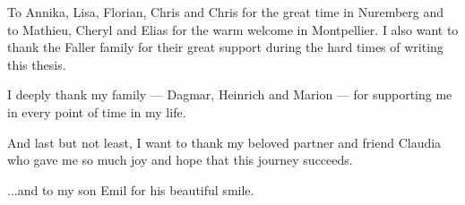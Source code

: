 \begin{small}
\bigskip

To Annika, Lisa, Florian, Chris and Chris for the great time in Nuremberg and to Mathieu, Cheryl and Elias for the warm welcome in Montpellier.
I also want to thank the Faller family for their great support during the hard times of writing this thesis.

\bigskip

I deeply thank my family --- Dagmar, Heinrich and Marion --- for supporting me in every point of time in my life.

\bigskip

And last but not least, I want to thank my beloved partner and friend Claudia who gave me so much joy and hope that this journey succeeds.

\bigskip

...and to my son Emil for his beautiful smile.

\end{small}
\endgroup
